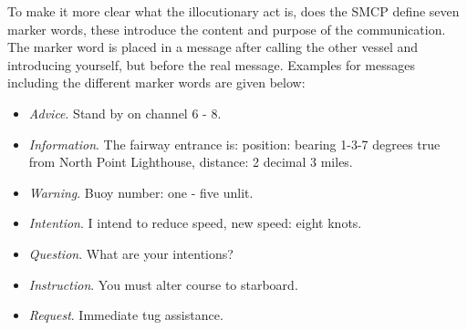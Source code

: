 To make it more clear what the illocutionary act is, does the \ac{SMCP} define seven marker words, these introduce the content and purpose of the communication. The marker word is placed in a message after calling the other vessel and introducing yourself, but before the real message. Examples for messages including the different marker words are given below:
\begin{itemize}
	\item \emph{Advice}. Stand by on channel 6 - 8.
	\item \emph{Information}. The fairway entrance is: position: bearing 1-3-7 degrees true from North Point Lighthouse, distance: 2 decimal 3 miles.
	\item \emph{Warning}. Buoy number: one - five unlit.
	\item \emph{Intention}. I intend to reduce speed, new speed: eight knots.
	\item \emph{Question}. What are your intentions?
	\item \emph{Instruction}. You must alter course to starboard.
	\item \emph{Request}. Immediate tug assistance.
\end{itemize}
